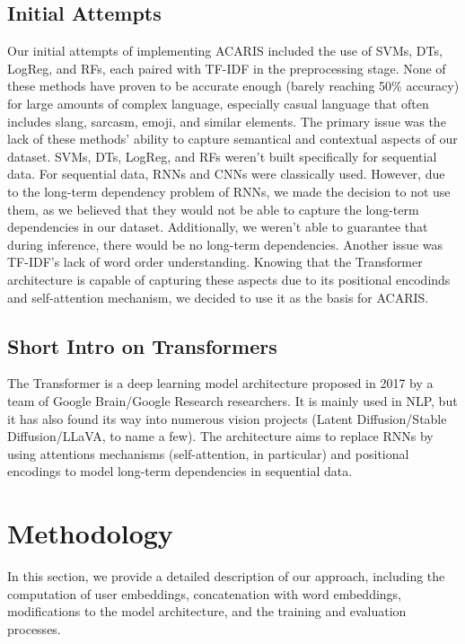 \documentclass{article}
\begin{document}
\subsection{Initial Attempts}
Our initial attempts of implementing ACARIS included the use of SVMs, DTs, LogReg, and RFs, each paired with TF-IDF in the preprocessing stage. None of these methods have proven to be accurate enough (barely reaching 50\% accuracy) for large amounts of complex language, especially casual language that often includes slang, sarcasm, emoji, and similar elements. The primary issue was the lack of these methods' ability to capture semantical and contextual aspects of our dataset. SVMs, DTs, LogReg, and RFs weren't built specifically for sequential data. For sequential data, RNNs and CNNs were classically used. However, due to the long-term dependency problem of RNNs, we made the decision to not use them, as we believed that they would not be able to capture the long-term dependencies in our dataset. Additionally, we weren't able to guarantee that during inference, there would be no long-term dependencies.
Another issue was TF-IDF's lack of word order understanding. Knowing that the Transformer\cite{vaswani2017attention} architecture is capable of capturing these aspects due to its positional encodinds and self-attention mechanism, we decided to use it as the basis for ACARIS.

\subsection{Short Intro on Transformers}
The Transformer is a deep learning model architecture proposed in 2017 by a team of Google Brain/Google Research researchers. It is mainly used in NLP, but it has also found its way into numerous vision projects (Latent Diffusion\cite{rombach2021highresolution}/Stable Diffusion/LLaVA\cite{liu2023visual}, to name a few). The architecture aims to replace RNNs by using attentions mechanisms (self-attention, in particular) and positional encodings to model long-term dependencies in sequential data.

\section{Methodology}
In this section, we provide a detailed description of our approach, including the computation of user embeddings, concatenation with word embeddings, modifications to the model architecture, and the training and evaluation processes.
\end{document}
